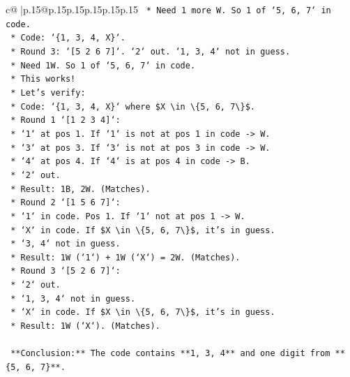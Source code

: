 \documentclass{article}
\begin{document}
{\begin{supertabular}{c@{$\;$}|p{.15\linewidth}@{}p{.15\linewidth}p{.15\linewidth}p{.15\linewidth}p{.15\linewidth}p{.15\linewidth}}
{{{\texttt{        *   Need 1 more W. So 1 of `5, 6, 7` in code.} \\
\texttt{        *   Code: `\{1, 3, 4, X\}`.} \\
\texttt{        *   Round 3: `{[}5 2 6 7{]}`. `2` out. `1, 3, 4` not in guess.} \\
\texttt{        *   Need 1W. So 1 of `5, 6, 7` in code.} \\
\texttt{        *   This works!} \\
\texttt{        *   Let's verify:} \\
\texttt{            *   Code: `\{1, 3, 4, X\}` where \$X \textbackslash{}in \textbackslash{}\{5, 6, 7\textbackslash{}\}\$.} \\
\texttt{            *   Round 1 `{[}1 2 3 4{]}`:} \\
\texttt{                *   `1` at pos 1. If `1` is not at pos 1 in code {-}> W.} \\
\texttt{                *   `3` at pos 3. If `3` is not at pos 3 in code {-}> W.} \\
\texttt{                *   `4` at pos 4. If `4` is at pos 4 in code {-}> B.} \\
\texttt{                *   `2` out.} \\
\texttt{                *   Result: 1B, 2W. (Matches).} \\
\texttt{            *   Round 2 `{[}1 5 6 7{]}`:} \\
\texttt{                *   `1` in code. Pos 1. If `1` not at pos 1 {-}> W.} \\
\texttt{                *   `X` in code. If \$X \textbackslash{}in \textbackslash{}\{5, 6, 7\textbackslash{}\}\$, it's in guess.} \\
\texttt{                *   `3, 4` not in guess.} \\
\texttt{                *   Result: 1W (`1`) + 1W (`X`) = 2W. (Matches).} \\
\texttt{            *   Round 3 `{[}5 2 6 7{]}`:} \\
\texttt{                *   `2` out.} \\
\texttt{                *   `1, 3, 4` not in guess.} \\
\texttt{                *   `X` in code. If \$X \textbackslash{}in \textbackslash{}\{5, 6, 7\textbackslash{}\}\$, it's in guess.} \\
\texttt{                *   Result: 1W (`X`). (Matches).} \\
\\ 
\texttt{    **Conclusion:** The code contains **1, 3, 4** and one digit from **\{5, 6, 7\}**.} \\
}}}
\end{supertabular}}
\end{document}
